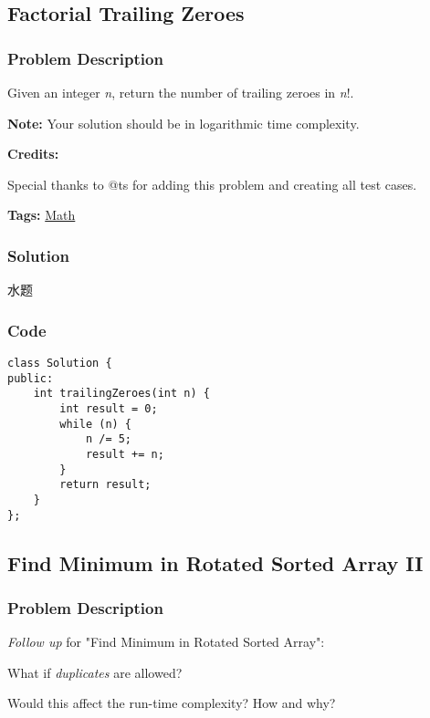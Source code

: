 \documentclass{article}
\begin{document}
\begin{CJK*}{UTF8}{gkai}
\subsection{ Factorial Trailing Zeroes }
\label{ Factorial Trailing Zeroes }

\subsubsection*{Problem Description}
Given an integer \emph{n}, return the number of trailing zeroes in \emph{n}!.

\textbf{Note: }Your solution should be in logarithmic time complexity.

\textbf{Credits:}

Special thanks to @ts for adding this problem and creating all test cases.


\textbf{Tags: }
\hyperref[ Math ]{ Math }



\subsubsection*{Solution}
水题

\subsubsection*{Code}
\begin{lstlisting}
class Solution {
public:
    int trailingZeroes(int n) {
        int result = 0;
        while (n) {
            n /= 5;
            result += n;
        }
        return result;
    }
}; 
\end{lstlisting}


\subsection{ Find Minimum in Rotated Sorted Array II }
\label{ Find Minimum in Rotated Sorted Array II }

\subsubsection*{Problem Description}
\emph{Follow up} for "Find Minimum in Rotated Sorted Array":


What if \emph{duplicates} are allowed?

Would this affect the run-time complexity? How and why?


\end{CJK*}
\end{document}
